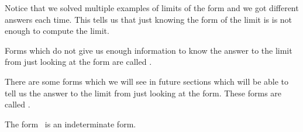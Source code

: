 \documentclass{ximera}
\begin{document}
Notice that we solved multiple examples of limits of the form
\zeroOverZero and we got different answers each time.  This tells us
that just knowing the form of the limit is \zeroOverZero is not enough
to compute the limit.

\begin{definition}
Forms which do not give us enough information to know the answer to
the limit from just looking at the form are called .

There are some forms which we will see in future sections which will
be able to tell us the answer to the limit from just looking at the
form. These forms are called .
\end{definition}  

The form \zeroOverZero\ is an indeterminate form.
\end{document}
